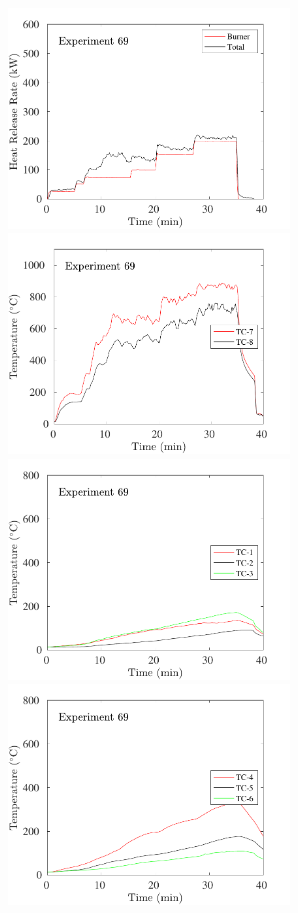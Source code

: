 \begin{figure}[H]
\includegraphics[height=2.30in]{../SCRIPT_FIGURES/Test_69_HRR} \hfill
\includegraphics[height=2.30in]{../SCRIPT_FIGURES/Test_69_TC_7-8} \\
\includegraphics[height=2.30in]{../SCRIPT_FIGURES/Test_69_TC_1-3} \hfill
\includegraphics[height=2.30in]{../SCRIPT_FIGURES/Test_69_TC_4-6}

\end{figure}
